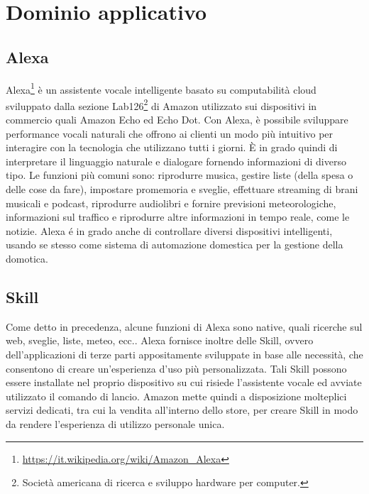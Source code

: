 \section{Dominio applicativo}
\subsection{Alexa}
Alexa\footnote{\href{Alexa. URL: https://it.wikipedia.org/wiki/Amazon\_Alexa}{https://it.wikipedia.org/wiki/Amazon\_Alexa}} è un assistente vocale intelligente basato su computabilità cloud sviluppato dalla sezione Lab126\footnote{Società americana di ricerca e sviluppo hardware per computer.} di Amazon utilizzato sui dispositivi in commercio quali Amazon Echo ed Echo Dot. Con Alexa, è possibile sviluppare performance vocali naturali che offrono ai clienti un modo più intuitivo per interagire con la tecnologia che utilizzano tutti i giorni. È in grado quindi di interpretare il linguaggio naturale e dialogare fornendo informazioni di diverso tipo. Le funzioni più comuni sono: riprodurre musica, gestire liste (della spesa o delle cose da fare), impostare promemoria e sveglie, effettuare streaming di brani musicali e podcast, riprodurre audiolibri e fornire previsioni meteorologiche, informazioni sul traffico e riprodurre altre informazioni in tempo reale, come le notizie. Alexa é in grado anche di controllare diversi dispositivi intelligenti, usando se stesso come sistema di automazione domestica per la gestione della domotica.

\subsection{Skill}
Come detto in precedenza, alcune funzioni di Alexa sono native, quali ricerche sul web, sveglie, liste, meteo, ecc.. Alexa fornisce inoltre delle Skill, ovvero dell'applicazioni di terze parti appositamente sviluppate in base alle necessità, che consentono di creare un’esperienza d'uso più personalizzata.
Tali Skill possono essere installate nel proprio dispositivo su cui risiede l'assistente vocale ed avviate utilizzato il comando di lancio.
Amazon mette quindi a disposizione molteplici servizi dedicati, tra cui la vendita all'interno dello store, per creare Skill in modo da rendere l'esperienza di utilizzo personale unica.

